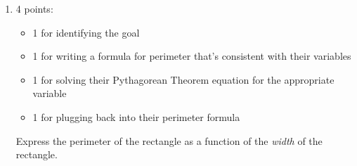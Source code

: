 \documentclass{article}
\begin{document}
\begin{enumerate}[resume]
\begin{enumerate}
\begin{solution}
      We also know the radius is $R$, and it's most useful to draw this to a corner of the rectangle:
      \begin{center}
      \end{center}
      Now, we see a right triangle with legs of length $h$ and $\dfrac{w}{2}$ and hypotenuse $R$. So, by the Pythagorean Theorem,
      \begin{align*}
        h^2 + \left( \frac{w}{2} \right)^2 &= R^2 \\
        \left( \frac{w}{2} \right)^2 &= R^2 - h^2 \\
        \frac{w}{2} &= \sqrt{R^2 - h^2} \\
        w &= 2 \sqrt{R^2 - h^2}
      \end{align*}
      We can plug this into our formula for area to get $A = wh = \boxed{ 2h\sqrt{R^2 -h^2}}$.
    \end{solution}

  \item

    \begin{grading}
      4 points:
      \begin{itemize}[nosep]
      \item 1 for identifying the goal
      \item 1 for writing a formula for perimeter that's consistent
        with their variables
      \item 1 for solving their Pythagorean Theorem equation for the
        appropriate variable
      \item 1 for plugging back into their perimeter formula
      \end{itemize}
    \end{grading}

    \begin{problem}[\vfill]
      Express the perimeter of the rectangle as a function of the
      \emph{width} of the rectangle. 
    \end{problem}


\end{enumerate}
\end{enumerate}
\end{document}
